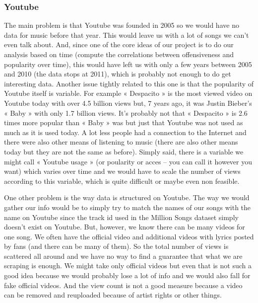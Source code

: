 \documentclass[11pt]{article}
\begin{document}
\subsubsection{Youtube}
The main problem is that Youtube was founded in 2005 so we would have no data for music before that
year. This would leave us with a lot of songs we can’t even talk about. And, since one of the core ideas of
our project is to do our analysis based on time (compute the correlations between offensiveness and
popularity over time), this would have left us with only a few years between 2005 and 2010 (the data
stops at 2011), which is probably not enough to do get interesting data. Another issue tightly related to
this one is that the popularity of Youtube itself is variable. For example « Despacito » is the most viewed
video on Youtube today with over 4.5 billion views but, 7 years ago, it was Justin Bieber’s « Baby » with
only 1.7 billion views. It’s probably not that « Despacito » is 2.6 times more popular than « Baby » was
but just that Youtube was not used as much as it is used today. A lot less people had a connection to the
Internet and there were also other means of listening to music (there are also other means today but they
are not the same as before). Simply said, there is a variable we might call « Youtube usage » (or poularity
or acces – you can call it however you want) which varies over time and we would have to scale the
number of views according to this variable, which is quite difficult or maybe even non feasible.


One other problem is the way data is structured on Youtube. The way we would gather our info would be
to simply try to match the names of our songs with the name on Youtube since the track id used in the
Million Songs dataset simply doesn’t exist on Youtube. But, however, we know there can be many videos
for one song. We often have the official video and additional videos with lyrics posted by fans (and there
can be many of them). So the total number of views is scattered all around and we have no way to find a
guarantee that what we are scraping is enough. We might take only official videos but even that is not
such a good idea because we would probably lose a lot of info and we would also fall for fake official
videos. And the view count is not a good measure because a video can be removed and reuploaded
because of artist rights or other things.
\end{document}
